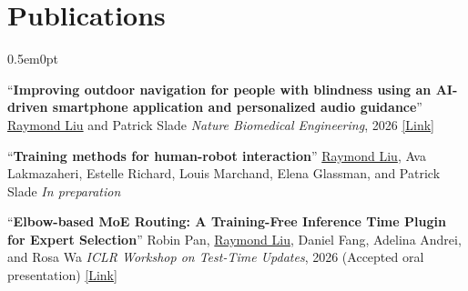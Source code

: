 \documentclass[letterpaper,11pt]{article}
\begin{document}
\vspace{-10pt}
\section{Publications}
\begin{adjustwidth}{0.5em}{0pt}

``\textbf{Improving outdoor navigation for people with blindness using an AI-driven smartphone application and personalized audio guidance}''
\newline\underline{Raymond Liu} and Patrick Slade
\newline\textit{Nature Biomedical Engineering}, 2026 \href{https://www.nature.com/articles/s41551-026-01772-x}{[Link]}

``\textbf{Training methods for human-robot interaction}''
\newline\underline{Raymond Liu}, Ava Lakmazaheri, Estelle Richard, Louis Marchand, Elena Glassman, and Patrick Slade
\newline\textit{In preparation}

``\textbf{Elbow-based MoE Routing: A Training-Free Inference Time Plugin for Expert Selection}''
\newline Robin Pan, \underline{Raymond Liu}, Daniel Fang, Adelina Andrei, and Rosa Wa
\newline\textit{ICLR Workshop on Test-Time Updates}, 2026 (Accepted oral presentation) \href{https://arxiv.org/pdf/2608.04401}{[Link]}

\end{adjustwidth}

\vspace{-2pt}
\end{document}
